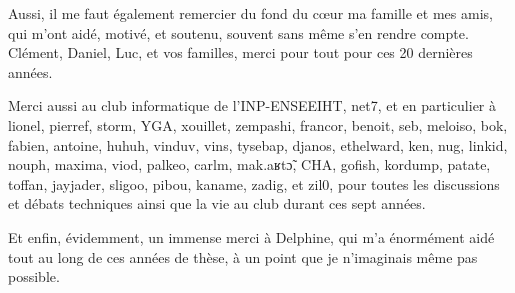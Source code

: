 Aussi, il me faut également remercier du fond du cœur ma famille et mes amis, qui m'ont aidé, motivé, et soutenu,
souvent sans même s'en rendre compte. Clément, Daniel, Luc, et vos familles, merci pour tout pour ces 20 dernières
années.

Merci aussi au club informatique de l'INP-ENSEEIHT, net7, et en particulier à lionel, pierref, storm, YGA, xouillet,
zempashi, francor, benoit, seb, meloiso, bok, fabien, antoine, huhuh, vinduv, vins, tysebap, djanos, ethelward, ken,
nug, linkid, nouph, maxima, viod, palkeo, carlm, mak.aʁtɔ̃, CHA, gofish, kordump, patate, toffan, jayjader, sligoo,
pibou, kaname, zadig, et zil0, pour toutes les discussions et débats techniques ainsi que la vie au club durant ces
sept années.

Et enfin, évidemment, un immense merci à Delphine, qui m'a énormément aidé tout au long de ces années de thèse, à un
point que je n'imaginais même pas possible.
